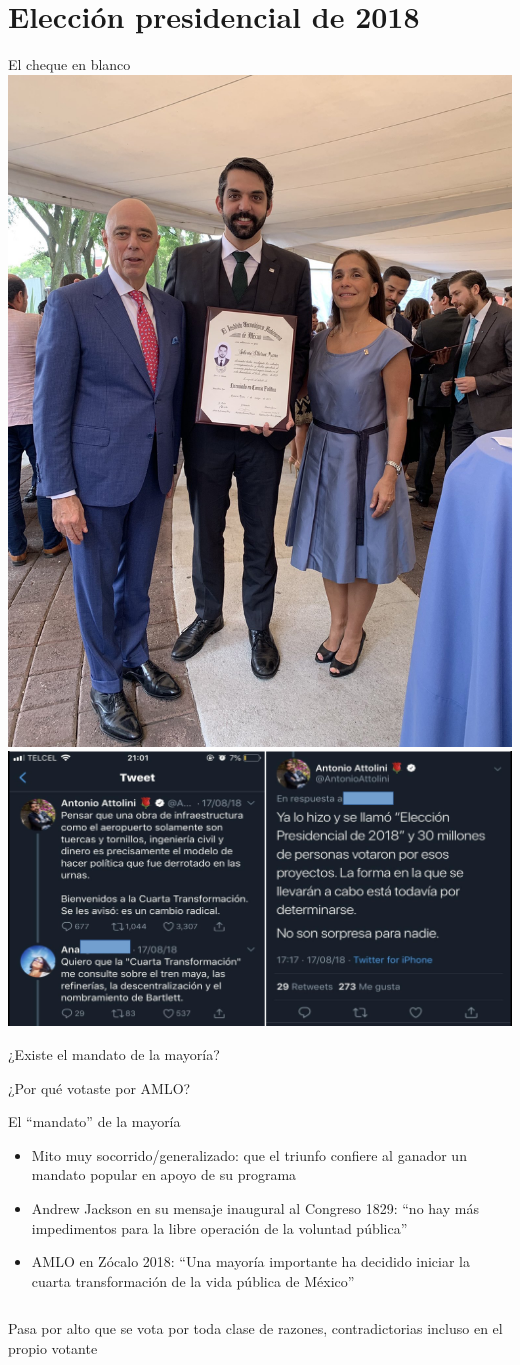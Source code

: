 \documentclass[bigger]{beamer}
\begin{document}
\section{Elección presidencial de 2018}
\label{sec:org2051c22}
\begin{frame}[label={sec:org532b012}]{El cheque en blanco}
\centering
\includegraphics[width=.2\textwidth]{./pics/atto-titu.jpeg}
\includegraphics[width=.8\textwidth]{./pics/at1-2.png}

\bigskip
¿Existe el \alert{mandato de la mayoría}?
\end{frame}
\begin{frame}[label={sec:orgb212461}]{¿Por qué votaste por AMLO?}
\begin{block}{El ``mandato'' de la mayoría}
\begin{itemize}
\item Mito muy socorrido/generalizado: que el triunfo confiere al ganador un mandato popular en apoyo de su programa
\item Andrew Jackson en su mensaje inaugural al Congreso 1829: ``no hay más impedimentos para la libre operación de la voluntad pública''
\item AMLO en Zócalo 2018: ``Una mayoría importante ha decidido iniciar la cuarta transformación de la vida pública de México''
\end{itemize}

\pause \bigskip
\end{block}
\begin{columns}
\begin{column}{0.6\columnwidth}
Pasa por alto que se vota por toda clase de razones, contradictorias incluso en el propio votante
\end{column}
\end{columns}
\end{frame}
\end{document}
